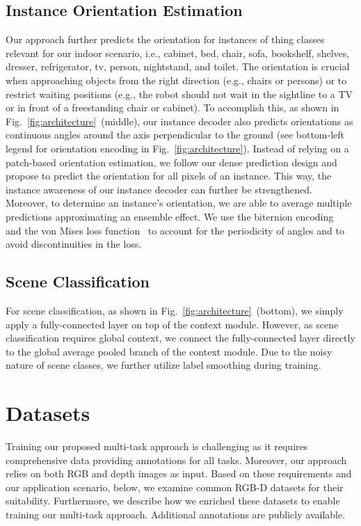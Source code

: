 \documentclass[conference]{IEEEtran}
\begin{document}
\subsection{Instance Orientation Estimation}
\label{sec:main:orientation_estimation}
Our approach further predicts the orientation for instances of thing classes relevant for our indoor scenario, i.e., cabinet, bed, chair, sofa, bookshelf, shelves, dresser, refrigerator, tv, person, nightstand, and toilet.
The orientation is crucial when approaching objects from the right direction (e.g., chairs or persons) or to restrict waiting positions (e.g., the robot should not wait in the
sightline to a TV or in front of a freestanding chair or cabinet).
To accomplish this, as shown in Fig.~\ref{fig:architecture}~(middle), our instance decoder also predicts orientations as continuous angles around the axis perpendicular to the ground (see bottom-left legend for orientation encoding in Fig.~\ref{fig:architecture}).
Instead of relying on a patch-based orientation estimation, we follow our dense prediction design and propose to predict the orientation for all pixels of an instance.
This way, the instance awareness of our instance decoder can further be strengthened.
Moreover, to determine an instance's orientation, we are able to average multiple predictions approximating an ensemble effect.
We use the biternion encoding~\cite{Biternion-gcpr2015} and the von Mises loss function~\cite{Biternion-gcpr2015} to account for the periodicity of angles and to avoid discontinuities in the loss.

\subsection{Scene Classification}
\label{sec:main:scene_classification}
For scene classification, as shown in Fig.~\ref{fig:architecture}~(bottom), we simply apply a fully-connected layer on top of the context \mbox{module}.
However, as scene classification requires global context, we connect the fully-connected layer directly to the global average pooled branch of the context module.
Due to the noisy nature of scene classes, we further utilize label smoothing during training.
 \section{Datasets}
\label{sec:datasets}
Training our proposed multi-task approach is challenging as it requires comprehensive data providing annotations for all tasks.
Moreover, our approach relies on both RGB and depth images as input.
Based on these requirements and our application scenario, below, we examine common RGB-D datasets for their suitability.
Furthermore, we describe how we enriched these datasets to enable training our multi-task approach.
Additional annotations are publicly available.
\end{document}
